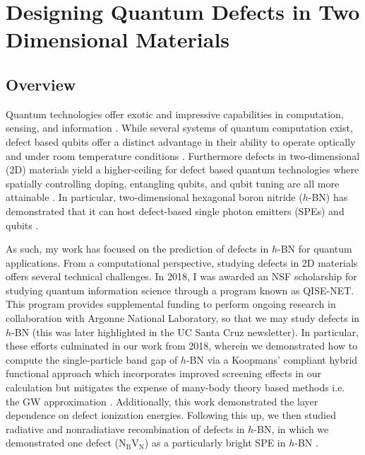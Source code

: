 \chapter{Designing Quantum Defects in Two Dimensional Materials}

\section{Overview}
Quantum technologies offer exotic and impressive capabilities in computation, sensing, and information \cite{malik2019science}. While several systems of quantum computation exist, defect based qubits offer a distinct advantage in their ability to operate optically and under room temperature conditions \cite{koehl2011room,gordon2013quantum,falk2013polytype}. Furthermore defects in two-dimensional (2D) materials yield a higher-ceiling for defect based quantum technologies where spatially controlling doping, entangling qubits, and qubit tuning are all more attainable \cite{aharonovich2017quantum,sajid2020single}. In particular, two-dimensional hexagonal boron nitride ($h$-BN) has demonstrated that it can host defect-based single photon emitters (SPEs) \cite{grosso2017tunable} and qubits \cite{gottscholl2020initialization}.

As such, my work has focused on the prediction of defects in $h$-BN for quantum applications. From a computational perspective, studying defects in 2D materials offers several technical challenges. In 2018, I was awarded an NSF scholarship for studying quantum information science through a program known as QISE-NET. This program provides supplemental funding to perform ongoing research in collaboration with Argonne National Laboratory, so that we may study defects in $h$-BN (this was later highlighted in the UC Santa Cruz newsletter). In particular, these efforts culminated in our work from 2018, wherein we demonstrated how to compute the single-particle band gap of $h$-BN via a Koopmans' compliant hybrid functional approach which incorporates improved screening effects in our calculation but mitigates the expense of many-body theory based methods i.e. the GW approximation \cite{smart2018}. Additionally, this work demonstrated the layer dependence on defect ionization energies. Following this up, we then studied radiative and nonradiatiave recombination of defects in $h$-BN, in which we demonstrated one defect (N$_\text{B}$V$_\text{N}$) as a particularly bright SPE in $h$-BN \cite{wu2019carrier}.
